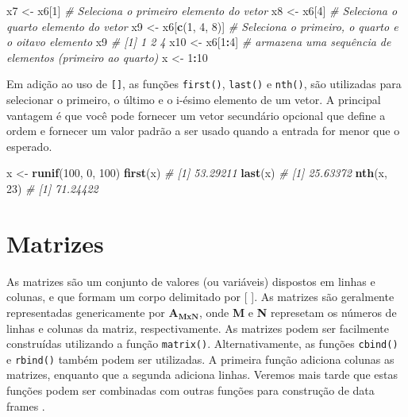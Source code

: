 \documentclass[
]{book}
\newenvironment{Shaded}{\begin{snugshade}}{\end{snugshade}}
\newcommand{\CommentTok}[1]{\textcolor[rgb]{0.56,0.35,0.01}{\textit{#1}}}
\newcommand{\DecValTok}[1]{\textcolor[rgb]{0.00,0.00,0.81}{#1}}
\newcommand{\KeywordTok}[1]{\textcolor[rgb]{0.13,0.29,0.53}{\textbf{#1}}}
\newcommand{\NormalTok}[1]{#1}
\newcommand{\OperatorTok}[1]{\textcolor[rgb]{0.81,0.36,0.00}{\textbf{#1}}}
\newcommand{\StringTok}[1]{\textcolor[rgb]{0.31,0.60,0.02}{#1}}
\begin{document}
\begin{Shaded}
\begin{Highlighting}[]
\NormalTok{x7 <-}\StringTok{ }\NormalTok{x6[}\DecValTok{1}\NormalTok{] }\CommentTok{# Seleciona o primeiro elemento do vetor }
\NormalTok{x8 <-}\StringTok{ }\NormalTok{x6[}\DecValTok{4}\NormalTok{] }\CommentTok{#  Seleciona o quarto elemento do vetor }
\NormalTok{x9 <-}\StringTok{ }\NormalTok{x6[}\KeywordTok{c}\NormalTok{(}\DecValTok{1}\NormalTok{, }\DecValTok{4}\NormalTok{, }\DecValTok{8}\NormalTok{)] }\CommentTok{# Seleciona o primeiro, o quarto e o oitavo elemento}
\NormalTok{x9}
\CommentTok{# [1] 1 2 4}
\NormalTok{x10 <-}\StringTok{ }\NormalTok{x6[}\DecValTok{1}\OperatorTok{:}\DecValTok{4}\NormalTok{] }\CommentTok{# armazena uma sequência de elementos (primeiro ao quarto)}
\NormalTok{x <-}\StringTok{ }\DecValTok{1}\OperatorTok{:}\DecValTok{10}
\end{Highlighting}
\end{Shaded}

Em adição ao uso de \texttt{{[}{]}}, as funções \texttt{first()}, \texttt{last()} e \texttt{nth()},  são utilizadas para selecionar o primeiro, o último e o i-ésimo elemento de um vetor. A principal vantagem é que você pode fornecer um vetor secundário opcional que define a ordem e fornecer um valor padrão a ser usado quando a entrada for menor que o esperado.

\begin{Shaded}
\begin{Highlighting}[]
\NormalTok{x <-}\StringTok{ }\KeywordTok{runif}\NormalTok{(}\DecValTok{100}\NormalTok{, }\DecValTok{0}\NormalTok{, }\DecValTok{100}\NormalTok{)}
\KeywordTok{first}\NormalTok{(x)}
\CommentTok{# [1] 53.29211}
\KeywordTok{last}\NormalTok{(x)}
\CommentTok{# [1] 25.63372}
\KeywordTok{nth}\NormalTok{(x, }\DecValTok{23}\NormalTok{)}
\CommentTok{# [1] 71.24422}
\end{Highlighting}
\end{Shaded}

\hypertarget{matrizes}{%
\section{Matrizes}\label{matrizes}}

As matrizes  são um conjunto de valores (ou variáveis) dispostos em linhas e colunas, e que formam um corpo delimitado por {[} {]}. As matrizes são geralmente representadas genericamente por \({{\boldsymbol{A}}_{{\boldsymbol{MxN}}}}\), onde \textbf{M} e \textbf{N} represetam os números de linhas e colunas da matriz, respectivamente. As matrizes podem ser facilmente construídas utilizando a função \texttt{matrix()}. Alternativamente, as funções \texttt{cbind()} e \texttt{rbind()} também podem ser utilizadas. A primeira função adiciona colunas as matrizes, enquanto que a segunda adiciona linhas. Veremos mais tarde que estas funções podem ser combinadas com outras funções para construção de data frames .
\end{document}
